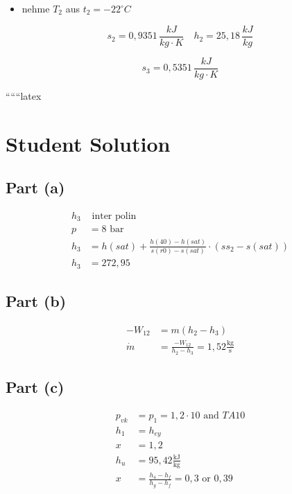 \begin{itemize}
    \item nehme $T_2$ aus $t_2 = -22^\circ C$
\end{itemize}

\[
s_2 = 0,9351 \, \frac{kJ}{kg \cdot K} \quad h_2 = 25,18 \, \frac{kJ}{kg}
\]

\[
s_3 = 0,5351 \, \frac{kJ}{kg \cdot K}
\]

``````latex


\section*{Student Solution}

\subsection*{Part (a)}

\begin{align*}
    h_3 & \text{ inter polin} \\
    p &= 8 \text{ bar} \\
    h_3 &= h(sat) + \frac{h(40) - h(sat)}{s(r0) - s(sat)} \cdot (s s_2 - s(sat)) \\
    h_3 &= 272,95
\end{align*}

\subsection*{Part (b)}

\begin{align*}
    -W_{12} &= m(h_2 - h_3) \\
    \dot{m} &= \frac{-W_{12}}{h_2 - h_3} = 1,52 \frac{\text{kg}}{\text{s}}
\end{align*}

\subsection*{Part (c)}

\begin{align*}
    p_{vk} &= p_1 = 1,2 \cdot 10 \text{ and } T A 10 \\
    h_1 &= h_{ey} \\
    x &= 1,2 \\
    h_u &= 95,42 \frac{\text{kJ}}{\text{kg}} \\
    x &= \frac{h_4 - h_f}{h_g - h_f} = 0,3 \text{ or } 0,39
\end{align*}


